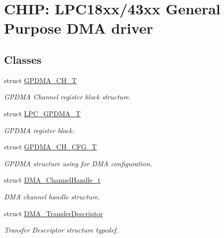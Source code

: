 \hypertarget{group___g_p_d_m_a__18_x_x__43_x_x}{}\section{C\+H\+IP\+: L\+P\+C18xx/43xx General Purpose D\+MA driver}
\label{group___g_p_d_m_a__18_x_x__43_x_x}
\subsection*{Classes}
\begin{DoxyCompactItemize}
\item 
struct \hyperlink{struct_g_p_d_m_a___c_h___t}{G\+P\+D\+M\+A\+\_\+\+C\+H\+\_\+T}
\begin{DoxyCompactList}\small\item\em G\+P\+D\+MA Channel register block structure. \end{DoxyCompactList}\item 
struct \hyperlink{struct_l_p_c___g_p_d_m_a___t}{L\+P\+C\+\_\+\+G\+P\+D\+M\+A\+\_\+T}
\begin{DoxyCompactList}\small\item\em G\+P\+D\+MA register block. \end{DoxyCompactList}\item 
struct \hyperlink{struct_g_p_d_m_a___c_h___c_f_g___t}{G\+P\+D\+M\+A\+\_\+\+C\+H\+\_\+\+C\+F\+G\+\_\+T}
\begin{DoxyCompactList}\small\item\em G\+P\+D\+MA structure using for D\+MA configuration. \end{DoxyCompactList}\item 
struct \hyperlink{struct_d_m_a___channel_handle__t}{D\+M\+A\+\_\+\+Channel\+Handle\+\_\+t}
\begin{DoxyCompactList}\small\item\em D\+MA channel handle structure. \end{DoxyCompactList}\item 
struct \hyperlink{struct_d_m_a___transfer_descriptor}{D\+M\+A\+\_\+\+Transfer\+Descriptor}
\begin{DoxyCompactList}\small\item\em Transfer Descriptor structure typedef. \end{DoxyCompactList}\end{DoxyCompactItemize}
